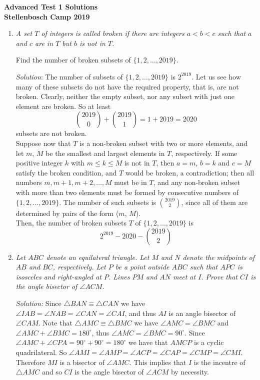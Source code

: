 \documentclass{article}
\begin{document}
\begin{center}
  \textbf{\Large Advanced Test 1 Solutions}
  \\ \vspace{1em}
  \textbf{\large Stellenbosch Camp 2019}
\end{center}


\begin{enumerate}[1.]

\item %
{\itshape
A set $T$ of integers is called \emph{broken} if there are integers $a < b < c$ such that $a$ and $c$ are in $T$ but $b$ is not in $T$.

Find the number of broken subsets of $\{1, 2, \dotsc, 2019\}$.}

\textit{Solution}:
The number of subsets of $\{1, 2, \dots, 2019\}$ is $2^{2019}$. Let us see how many of these subsets do not have the required property, that is, are not broken.
Clearly, neither the empty subset, nor any subset with just one element are broken. So at least
$$\binom{2019}{0} + \binom{2019}{1} = 1 + 2019 = 2020$$
subsets are not broken.\\
Suppose now that $T$ is a non-broken subset with two or more elements, and let $m$, $M$ be the smallest and largest elements in $T$, respectively. If some positive integer $k$ with $m \le k \le M$ is not in $T$, then $a = m$, $b = k$ and $c = M$ satisfy the broken condition, and $T$ would be broken, a contradiction; then all numbers $m, m + 1, m + 2, \dots, M$ must be in $T$, and any non-broken subset with more than two elements must be formed by consecutive numbers of $\{1, 2, \dots, 2019\}$.
The number of such subsets is $\binom{2019}{2}$, since all of them are determined by pairs of the form ($m$, $M$).\\
Then, the number of broken subsets $T$ of $\{1, 2, \dots, 2019\}$ is
$$2^{2019} - 2020 - \binom{2019}{2}$$


\item %
{\itshape
Let $ABC$ denote an equilateral triangle.
Let $M$ and $N$ denote the midpoints of $AB$ and $BC$, respectively.
Let $P$ be a point outside $ABC$ such that $APC$ is isosceles and right-angled at $P$.
Lines $PM$ and $AN$ meet at $I$.
Prove that $CI$ is the angle bisector of $\angle ACM$.}

\textit{Solution:}
Since $\triangle BAN \equiv \triangle CAN$ we have $\angle IAB = \angle NAB = \angle CAN = \angle CAI $, and thus $AI$ is an angle bisector of $\angle CAM$. Note that $\triangle AMC \equiv \triangle BMC$ we have $\angle AMC = \angle BMC$ and $\angle AMC + \angle BMC =180^\circ$, thus $\angle AMC = \angle BMC = 90^\circ$. Since $\angle AMC + \angle CPA = 90^\circ +90^\circ =180^\circ$ we have that $AMCP$ is a cyclic quadrilateral. So $\angle AMI = \angle AMP = \angle ACP = \angle CAP = \angle CMP = \angle CMI$. Therefore $MI$ is a bisector of $\angle AMC$. This implies that $I$ is the incentre of $\triangle AMC$ and so $CI$ is the angle bisector of $\angle ACM$ by necessity.



\end{enumerate}
\end{document}
